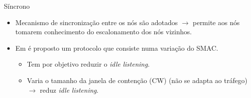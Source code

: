 \documentclass{beamer}
\begin{document}
\begin{frame}{Síncrono}
  \begin{itemize}
    \item Mecanismo de sincronização entre os nós são adotados $\rightarrow$ permite aos nós tomarem conhecimento do escalonamento dos nós vizinhos.
    \item Em \cite{20102012936055} é proposto um protocolo que consiste numa variação do SMAC.
      \begin{itemize}
	\item Tem por objetivo reduzir o \emph{idle listening}.
	\item Varia o tamanho da janela de contenção (CW) (não se adapta ao tráfego) $\rightarrow$ reduz \emph{idle listening}.
      \end{itemize}
  \end{itemize}
\end{frame}
\end{document}
